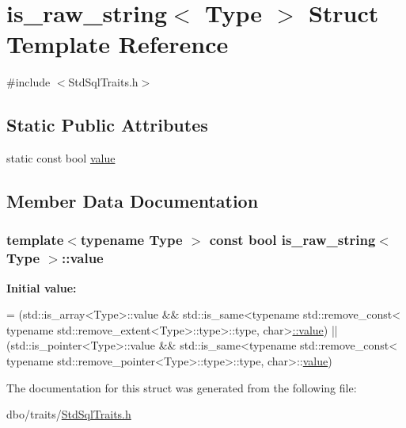 \hypertarget{structis__raw__string}{\section{is\+\_\+raw\+\_\+string$<$ Type $>$ Struct Template Reference}
\label{structis__raw__string}
}


{\ttfamily \#include $<$Std\+Sql\+Traits.\+h$>$}

\subsection*{Static Public Attributes}
\begin{DoxyCompactItemize}
\item 
static const bool \hyperlink{structis__raw__string_aa91ff7e983c848d28278d63c133c28bd}{value}
\end{DoxyCompactItemize}


\subsection{Member Data Documentation}
\hypertarget{structis__raw__string_aa91ff7e983c848d28278d63c133c28bd}{
\subsubsection[{value}]{\setlength{\rightskip}{0pt plus 5cm}template$<$typename Type $>$ const bool {\bf is\+\_\+raw\+\_\+string}$<$ Type $>$\+::value\hspace{0.3cm}{\ttfamily [static]}}}\label{structis__raw__string_aa91ff7e983c848d28278d63c133c28bd}
{\bfseries Initial value\+:}
\begin{DoxyCode}
=
        (std::is\_array<Type>::value &&
            std::is\_same<\textcolor{keyword}{typename} std::remove\_const<
                \textcolor{keyword}{typename} std::remove\_extent<Type>::type>::type, \textcolor{keywordtype}{char}>\hyperlink{structis__raw__string_aa91ff7e983c848d28278d63c133c28bd}{::value}) ||
        (std::is\_pointer<Type>::value &&
            std::is\_same<\textcolor{keyword}{typename} std::remove\_const<
                \textcolor{keyword}{typename} std::remove\_pointer<Type>::type>::type, \textcolor{keywordtype}{char}>::\hyperlink{structis__raw__string_aa91ff7e983c848d28278d63c133c28bd}{value})
\end{DoxyCode}


The documentation for this struct was generated from the following file\+:\begin{DoxyCompactItemize}
\item 
dbo/traits/\hyperlink{_std_sql_traits_8h}{Std\+Sql\+Traits.\+h}\end{DoxyCompactItemize}
